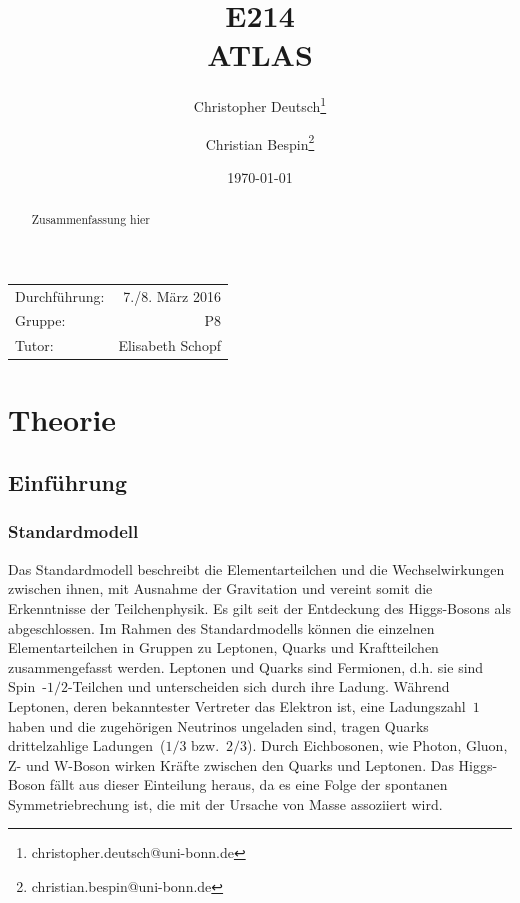 \documentclass[11pt, a4paper]{article}
\title{E214 \\ ATLAS}
\author{Christopher Deutsch\footnote{christopher.deutsch@uni-bonn.de} \and Christian Bespin\footnote{christian.bespin@uni-bonn.de}}
\date{\today}
\numberwithin{equation}{section}
\begin{document}
\begin{titlepage}

\maketitle

\begin{center}
\begin{tabular}{l r}
Durchführung: & 7./8. März 2016 \\
Gruppe: & P8 \\
Tutor: & Elisabeth Schopf
\end{tabular}
\end{center}

\begin{abstract}
\noindent Zusammenfassung hier
\end{abstract}

\end{titlepage}

\tableofcontents
\newpage

\section{Theorie}

\subsection{Einführung}

\subsubsection{Standardmodell}

Das Standardmodell beschreibt die Elementarteilchen und die Wechselwirkungen zwischen ihnen, mit Ausnahme der Gravitation und vereint somit die Erkenntnisse der Teilchenphysik.
Es gilt seit der Entdeckung des Higgs-Bosons als abgeschlossen.
Im Rahmen des Standardmodells können die einzelnen Elementarteilchen in Gruppen zu Leptonen, Quarks und Kraftteilchen zusammengefasst werden.
Leptonen und Quarks sind Fermionen, d.h. sie sind Spin~-$1/2$-Teilchen und unterscheiden sich durch ihre Ladung.
Während Leptonen, deren bekanntester Vertreter das Elektron ist, eine Ladungszahl~$1$ haben und die zugehörigen Neutrinos ungeladen sind, tragen Quarks drittelzahlige Ladungen~($1/3$ bzw.~$2/3$).
Durch Eichbosonen, wie Photon, Gluon, Z- und W-Boson wirken Kräfte zwischen den Quarks und Leptonen.
Das Higgs-Boson fällt aus dieser Einteilung heraus, da es eine Folge der spontanen Symmetriebrechung ist, die mit der Ursache von Masse assoziiert wird.
\end{document}
